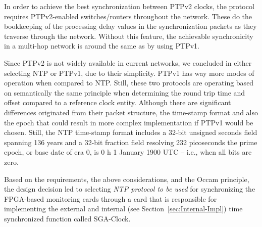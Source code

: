 \documentclass[journal]{IEEEtran}
\begin{document}
In order to achieve the best synchronization between PTPv2 clocks, the protocol requires PTPv2-enabled switches/routers throughout the network. These do the bookkeeping of the processing delay values in the synchronization packets as they traverse through the network. Without this feature, the achievable synchronicity in a multi-hop network is around the same as by using PTPv1.

Since PTPv2 is not widely available in current networks, we concluded in either selecting NTP or PTPv1, due to their simplicity. PTPv1 has way more modes of operation when compared to NTP. Still, these two protocols are operating based on semantically the same principle when determining the round
trip time and offset
compared to a reference clock entity. Although there are significant differences originated from their packet structure, the
time-stamp format and also the epoch that could result in more complex implementation if PTPv1 would be chosen.
Still, the NTP time-stamp format includes a 32-bit unsigned seconds field spanning 136 years and a 32-bit fraction field resolving 232
picoseconds the prime epoch, or base date of era 0, is 0 h 1 January 1900 UTC -- i.e., when all bits are zero.

Based on the requirements, the above considerations, and the Occam principle, the design decision led to selecting \emph{NTP protocol to be used} for synchronizing the
FPGA-based monitoring cards through a card that is responsible for implementing the external and internal (see
Section~\ref{sec:Internal-Impl}) time synchronized function called SGA-Clock.
\end{document}

